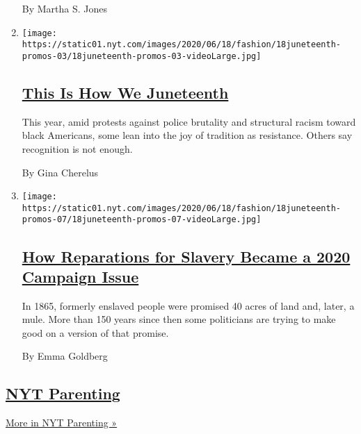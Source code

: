 \begin{enumerate}
  By Martha S. Jones
\item
  \texttt{[image: https://static01.nyt.com/images/2020/06/18/fashion/18juneteenth-promos-03/18juneteenth-promos-03-videoLarge.jpg]}

  \hypertarget{this-is-how-we-juneteenth}{%
  \subsection{\texorpdfstring{\href{/article/juneteenth-celebration-history.html}{This
  Is How We
  Juneteenth}}{This Is How We Juneteenth}}\label{this-is-how-we-juneteenth}}

  This year, amid protests against police brutality and structural
  racism toward black Americans, some lean into the joy of tradition as
  resistance. Others say recognition is not enough.

  By Gina Cherelus
\item
  \texttt{[image: https://static01.nyt.com/images/2020/06/18/fashion/18juneteenth-promos-07/18juneteenth-promos-07-videoLarge.jpg]}

  \hypertarget{how-reparations-for-slavery-became-a-2020-campaign-issue}{%
  \subsection{\texorpdfstring{\href{/2020/06/18/us/politics/reparations-slavery.html}{How
  Reparations for Slavery Became a 2020 Campaign
  Issue}}{How Reparations for Slavery Became a 2020 Campaign Issue}}\label{how-reparations-for-slavery-became-a-2020-campaign-issue}}

  In 1865, formerly enslaved people were promised 40 acres of land and,
  later, a mule. More than 150 years since then some politicians are
  trying to make good on a version of that promise.

  By Emma Goldberg
\end{enumerate}

\hypertarget{nyt-parenting}{%
\subsection{\texorpdfstring{\href{/spotlight/parenting}{NYT
Parenting}}{NYT Parenting}}\label{nyt-parenting}}

\href{/spotlight/parenting}{More in NYT Parenting »}

